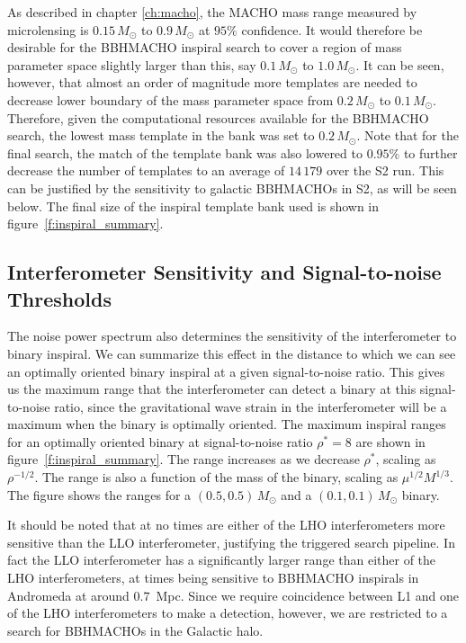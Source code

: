 As described in chapter \ref{ch:macho}, the MACHO mass range measured by
microlensing is $0.15\,M_\odot$ to $0.9\,M_\odot$ at $95\%$ confidence. It
would therefore be desirable for the BBHMACHO inspiral search to cover a
region of mass parameter space slightly larger than this, say $0.1\,M_\odot$
to $1.0\,M_\odot$.  It can be seen, however, that almost an order of magnitude
more templates are needed to decrease lower boundary of the mass parameter
space from $0.2\,M_\odot$ to $0.1\,M_\odot$.  Therefore, given the
computational resources available for the BBHMACHO search, the lowest mass
template in the bank was set to $0.2\,M_\odot$. Note that for the final
search, the match of the template bank was also lowered to $0.95\%$ to further
decrease the number of templates to an average of $14\,179$ over the S2 run.
This can be justified by the sensitivity to galactic BBHMACHOs in S2, as will
be seen below. The final size of the inspiral template bank used is shown in
figure~\ref{f:inspiral_summary}.
 
\subsection{Interferometer Sensitivity and Signal-to-noise Thresholds}
\label{ss:snrthreshold}

The noise power spectrum also determines the sensitivity of the interferometer
to binary inspiral. We can summarize this effect in the distance to which we
can see an optimally oriented binary inspiral at a given signal-to-noise
ratio. This gives us the maximum range that the interferometer can detect a
binary at this signal-to-noise ratio, since the gravitational wave strain in
the interferometer will be a maximum when the binary is optimally oriented.
The maximum inspiral ranges for an optimally oriented binary at
signal-to-noise ratio $\rho^\ast = 8$ are shown in
figure~\ref{f:inspiral_summary}.  The range increases as we decrease
$\rho^\ast$, scaling as $\rho^{-1/2}$. The range is also a function of the
mass of the binary, scaling as $\mu^{1/2}M^{1/3}$. The figure shows the ranges
for a $(0.5,0.5)\,M_\odot$ and a $(0.1,0.1)\,M_\odot$ binary.

It should be noted that at no times are either of the LHO interferometers more
sensitive than the LLO interferometer, justifying the triggered search
pipeline. In fact the LLO interferometer has a significantly larger range than
either of the LHO interferometers, at times being sensitive to BBHMACHO
inspirals in Andromeda at around $0.7$~Mpc.  Since we require coincidence
between L1 and one of the LHO interferometers to make a detection, however, we
are restricted to a search for BBHMACHOs in the Galactic halo.  

